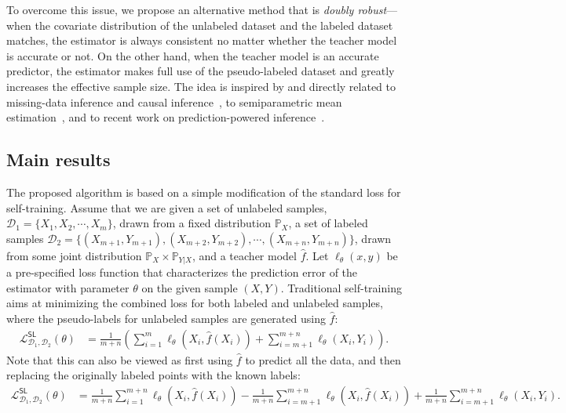 To overcome this issue, we propose an alternative method that is \emph{doubly robust}---when the covariate distribution of the unlabeled dataset and the labeled dataset matches, the estimator is always  consistent  no matter whether  the  teacher model is accurate or not. On the other hand, when the teacher model is an accurate predictor, the estimator makes full use of the pseudo-labeled dataset and greatly increases the effective sample size. The idea is inspired by and directly related to missing-data inference and causal inference~\citep{rubin1976inference, kang2007demystifying, birhanu2011doubly, ding2018causal},  to semiparametric mean estimation~\citep{zhang2019semi}, and to recent work on prediction-powered inference~\citep{angelopoulos2023prediction}. 

\subsection{Main results}
The proposed algorithm is based on a simple modification of the standard loss for self-training.   Assume that we are given a set of unlabeled samples, $\mathcal{D}_1 = \{X_1,X_2,\cdots, X_m\}$, drawn from a fixed distribution $\mathbb{P}_X$, a set of labeled samples $\mathcal{D}_2 =\{(X_{m+1}, Y_{m+1}), (X_{m+2}, Y_{m+2}), \cdots, (X_{m+n}, Y_{m+n})\}$, drawn from some joint distribution $\mathbb{P}_X\times \mathbb{P}_{Y|X}$, and a teacher model  $\hat f$. Let $\ell_\theta(x, y)$ be a pre-specified loss function that characterizes the prediction error of the estimator with parameter $\theta$ on the given sample $(X, Y)$. Traditional self-training aims at minimizing the combined loss for both labeled and unlabeled samples, where the pseudo-labels for unlabeled samples are generated using $\hat f$:
\begin{align*}
\mathcal{L}^{\mathsf{SL}}_{\mathcal{D}_1,\mathcal{D}_2}(\theta) 
& = \frac{1}{m+n}  \left(\sum_{i=1}^m \ell_\theta(X_i, \hat f(X_i)) + \sum_{i=m+1}^{m+n} \ell_\theta(X_i, Y_i)\right). %
\end{align*}
Note that this can also be viewed as first using $\hat f$ to predict all the data, and then replacing the originally labeled points with the known labels: 
\begin{align*}
\mathcal{L}^{\mathsf{SL}}_{\mathcal{D}_1,\mathcal{D}_2}(\theta) 
 & = \frac{1}{m+n}  \sum_{i=1}^{m+n} \ell_\theta(X_i, \hat f(X_i)) -  \frac{1}{m+n} \sum_{i=m+1}^{m+n} \ell_\theta(X_i, \hat f(X_i))  + \frac{1}{m+n} \sum_{i=m+1}^{m+n} \ell_\theta(X_i, Y_i). 
\end{align*}
